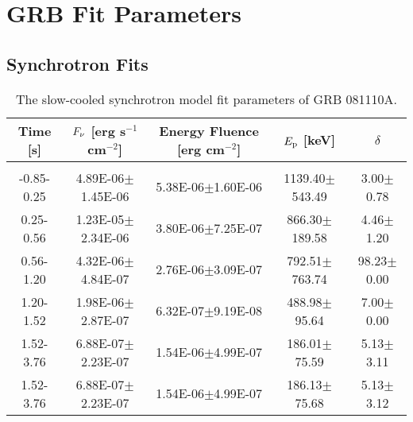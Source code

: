 \chapter{GRB Fit Parameters}
\label{ch:fitparams}


\section{Synchrotron Fits}
\begin{table}[h]
\centering
\scriptsize
\label{tab:}
\begin{tabular}{c| c c c c}
Time [s] & $F_{\nu}$ [erg s$^{-1}$ cm$^{-2}$] & Energy Fluence [erg cm$^{-2}$] & $E_{\rm p}$ [keV] & $\delta$ \\
\hline \hline\\ 

-0.85-0.25 & 4.89E-06$\pm$1.45E-06 & 5.38E-06$\pm$1.60E-06 & 1139.40$\pm$543.49 & 3.00$\pm$0.78 \\ 

0.25-0.56 & 1.23E-05$\pm$2.34E-06 & 3.80E-06$\pm$7.25E-07 & 866.30$\pm$189.58 & 4.46$\pm$1.20 \\ 

0.56-1.20 & 4.32E-06$\pm$4.84E-07 & 2.76E-06$\pm$3.09E-07 & 792.51$\pm$763.74 & 98.23$\pm$0.00 \\ 

1.20-1.52 & 1.98E-06$\pm$2.87E-07 & 6.32E-07$\pm$9.19E-08 & 488.98$\pm$95.64 & 7.00$\pm$0.00 \\ 

1.52-3.76 & 6.88E-07$\pm$2.23E-07 & 1.54E-06$\pm$4.99E-07 & 186.01$\pm$75.59 & 5.13$\pm$3.11 \\ 

1.52-3.76 & 6.88E-07$\pm$2.23E-07 & 1.54E-06$\pm$4.99E-07 & 186.13$\pm$75.68 & 5.13$\pm$3.12 \\ 

\end{tabular}
\caption{The slow-cooled synchrotron model fit parameters of GRB 081110A.}
\end{table}


